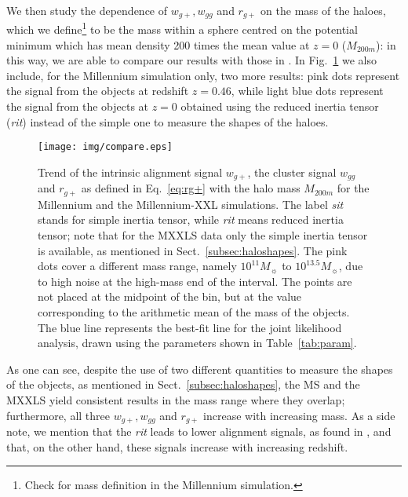 \documentclass[a4paper,fleqn,usenatbib]{mnras}
\begin{document}
We then study the dependence of $w_{g+}, w_{gg}$ and $r_{g+}$ on the mass of the haloes, which we define\footnote{Check for mass definition in the Millennium simulation.} to be the mass within a sphere centred on the potential minimum which has mean density 200 times the mean value at $z = 0$ ($M_{200m}$): in this way, we are able to compare our results with those in \citet[figure 7]{vanUitertJoachimi2017}. In Fig.~\ref{fig:vsmass} we also include, for the Millennium simulation only, two more results: pink dots represent the signal from the objects at redshift $z = 0.46$, while light blue dots represent the signal from the objects at $z = 0$ obtained using the reduced inertia tensor (\textit{rit}) instead of the simple one to measure the shapes of the haloes.
\begin{figure}
	\centerline{
	\texttt{[image: img/compare.eps]}}
	\caption{Trend of the intrinsic alignment signal $w_{g+}$, the cluster signal $w_{gg}$ and $r_{g+}$ as defined in Eq.~\ref{eq:rg+} with the halo mass $M_{200m}$ for the Millennium and the Millennium-XXL simulations. The label \textit{sit} stands for simple inertia tensor, while \textit{rit} means reduced inertia tensor; note that for the MXXLS data only the simple inertia tensor is available, as mentioned in Sect.~\ref{subsec:haloshapes}. The pink dots cover a different mass range, namely $10^{11} M_{\sun}$ to $10^{13.5} M_{\sun}$, due to high noise at the high-mass end of the interval. The points are not placed at the midpoint of the bin, but at the value corresponding to the arithmetic mean of the mass of the objects. The blue line represents the best-fit line for the joint likelihood analysis, drawn using the parameters shown in Table~\ref{tab:param}.}
	\label{fig:vsmass}
\end{figure}
As one can see, despite the use of two different quantities to measure the shapes of the objects, as mentioned in Sect.~\ref{subsec:haloshapes}, the MS and the MXXLS yield consistent results in the mass range where they overlap; furthermore, all three $w_{g+}, w_{gg}$ and $r_{g+}$ increase with increasing mass. As a side note, we mention that the \textit{rit} leads to lower alignment signals, as found in \citet{Joachimietal2013b}, and that, on the other hand, these signals increase with increasing redshift.
\end{document}
